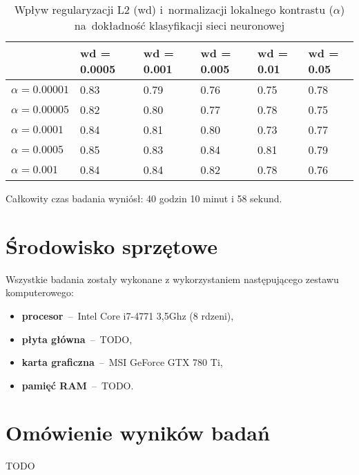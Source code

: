 \begin{table}
    \centering
    \begin{tabular}{|l|l|l|l|l|l|}
      \hline
                       & wd = 0.0005 & wd = 0.001 & wd = 0.005 & wd = 0.01 & wd = 0.05 \\
      \hline
      $\alpha=0.00001$ & 0.83 & 0.79 & 0.76 & 0.75 & 0.78 \\
      \hline
      $\alpha=0.00005$ & 0.82 & 0.80 & 0.77 & 0.78 & 0.75 \\
      \hline
      $\alpha=0.0001$  & 0.84 & 0.81 & 0.80 & 0.73 & 0.77 \\
      \hline
      $\alpha=0.0005$  & 0.85 & 0.83 & 0.84 & 0.81 & 0.79 \\
      \hline
      $\alpha=0.001$   & 0.84 & 0.84 & 0.82 & 0.78 & 0.76 \\
      \hline
    \end{tabular}
    \caption{Wpływ regularyzacji L2 (wd) i~normalizacji lokalnego kontrastu ($\alpha$) na~dokładność klasyfikacji sieci
    neuronowej}
    \label{table:wyniki1}
\end{table}

Całkowity czas badania wyniósł: 40 godzin 10 minut i 58 sekund.

\section{Środowisko sprzętowe}
Wszystkie badania zostały wykonane z wykorzystaniem następującego zestawu komputerowego:
\begin{itemize}
    \item \textbf{procesor}~--~Intel Core i7-4771 3,5Ghz (8 rdzeni),
    \item \textbf{płyta główna}~--~TODO,
    \item \textbf{karta graficzna}~--~MSI GeForce GTX 780 Ti,
    \item \textbf{pamięć RAM}~--~TODO.
\end{itemize}

\section{Omówienie wyników badań}
TODO
